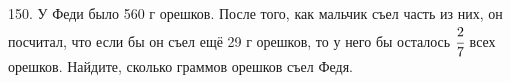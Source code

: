 150. У Феди было 560 г орешков. После того, как мальчик съел часть из них, он посчитал, что если бы он съел ещё 29 г орешков, то у него бы осталось $\cfrac{2}{7}$ всех орешков. Найдите, сколько граммов орешков съел Федя.\\
